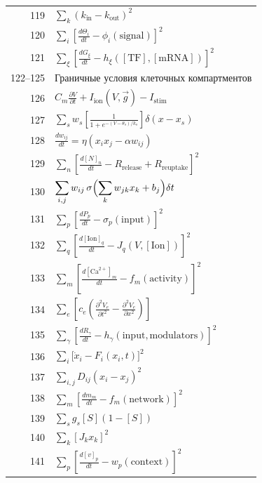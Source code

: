 \documentclass[12pt,a4paper]{article}
\begin{document}
\begin{longtable}{r p{}}
		119 & \(\displaystyle \sum_k(k_{\text{in}} - k_{\text{out}})^2\) \\
		120 & \(\displaystyle \sum_i\left[\frac{d\Theta_i}{dt} - \phi_i(\text{signal})\right]^2\) \\
		121 & \(\displaystyle \sum_\xi\left[\frac{dG_\xi}{dt} - h_\xi([\text{TF}],[\text{mRNA}])\right]^2\) \\
		122–125 & Граничные условия клеточных компартментов \\
		126 & \(\displaystyle C_m\frac{\partial V}{\partial t} + I_{\text{ion}}(V,\vec g) - I_{\text{stim}}\) \\
		127 & \(\displaystyle \sum_s w_s\left[\frac{1}{1+e^{-(V-\theta_s)/k_s}}\right]\delta(x-x_s)\) \\
		128 & \(\displaystyle \frac{dw_{ij}}{dt} = \eta(x_i x_j - \alpha w_{ij})\) \\
		129 & \(\displaystyle \sum_n\left[\frac{d[N]_n}{dt} - R_{\text{release}} + R_{\text{reuptake}}\right]^2\) \\
		130 & \(\displaystyle \sum_{i,j} w_{ij}\,\sigma\Bigl(\sum_k w_{jk}x_k + b_j\Bigr)\delta t\) \\
		131 & \(\displaystyle \sum_p\left[\frac{dP_p}{dt} - \sigma_p(\text{input})\right]^2\) \\
		132 & \(\displaystyle \sum_q\left[\frac{d[\text{Ion}]_q}{dt} - J_q(V,[\text{Ion}])\right]^2\) \\
		133 & \(\displaystyle \sum_m\left[\frac{d[\text{Ca}^{2+}]_m}{dt} - f_m(\text{activity})\right]^2\) \\
		134 & \(\displaystyle \sum_e\left[c_e\left(\frac{\partial^2 V_e}{\partial t^2} - \frac{\partial^2 V_e}{\partial x^2}\right)\right]\) \\
		135 & \(\displaystyle \sum_\gamma\left[\frac{dR_\gamma}{dt} - h_\gamma(\text{input},\text{modulators})\right]^2\) \\
		136 & \(\displaystyle \sum_i\bigl[\dot x_i - F_i(x_i,t)\bigr]^2\) \\
		137 & \(\displaystyle \sum_{i,j} D_{ij}(x_i - x_j)^2\) \\
		138 & \(\displaystyle \sum_m\left[\frac{dm_m}{dt} - f_m(\text{network})\right]^2\) \\
		139 & \(\displaystyle \sum_s g_s[S](1-[S])\) \\
		140 & \(\displaystyle \sum_k [J_k x_k]^2\) \\
		141 & \(\displaystyle \sum_p\left[\frac{d[v]_p}{dt} - w_p(\text{context})\right]^2\) \\

\end{longtable}
\end{document}
